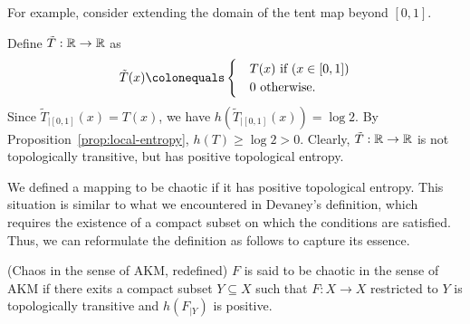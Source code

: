 \documentclass[10pt,twoside,draft]{book}
\begin{document}
For example, consider extending the domain of the tent map beyond $[0,1]$.
\begin{example}
  Define $\tilde{T}: \mathbb{R} \to \mathbb{R}$ as
  \begin{equation*}
    \tilde{T}(x) 
    \ceq \begin{cases}
      &T(x) \mbox{ if } (x \in [0,1]) \\
      &0 \mbox{ otherwise}.
    \end{cases}
  \end{equation*}
  Since $\tilde{T}_{|[0,1]}(x) = T(x)$, we have $h(\tilde{T}_{|[0,1]}(x)) = \log 2$. 
  By Proposition~\ref{prop:local-entropy}, $h(T) \geq \log 2 > 0$.
  Clearly, $\tilde{T}: \mathbb{R} \to \mathbb{R}$ is not topologically transitive, but has positive topological entropy.
\end{example}
We defined a mapping to be chaotic if it has positive topological entropy.
This situation is similar to what we encountered in Devaney's definition, which requires the existence of a compact subset on which the conditions are satisfied.
Thus, we can reformulate the definition as follows to capture its essence.
\begin{definition}
  (Chaos in the sense of AKM, redefined)
  $F$ is said to be chaotic in the sense of AKM if there exits a compact subset $Y \subseteq X$ such that $F: X \to X$ restricted to $Y$ is topologically transitive and $h(F_{|Y})$ is positive.
\end{definition}
\end{document}
